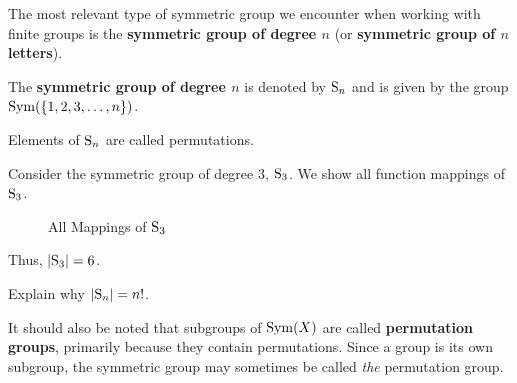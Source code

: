 The most relevant type of symmetric group we encounter when working with finite groups is the \textbf{symmetric group of degree $n$} (or \textbf{symmetric group of $n$ letters}).
\begin{definition}
    The \textbf{symmetric group of degree $n$} is denoted by $\mathrm{S}_{n}$ and is given by the group $\mathrm{Sym}(\{1, 2, 3, \dots, n\})$.
\end{definition}
\begin{remark}
    Elements of $\mathrm{S}_{n}$ are called permutations.
\end{remark}

\begin{example}\label{example-symmetric-group-of-degree-3}
    Consider the symmetric group of degree 3, $\mathrm{S}_{3}$. We show all function mappings of $\mathrm{S}_{3}$.

    \begin{figure}[h]
        \centering
        \caption{All Mappings of $\mathrm{S}_{3}$}
    \end{figure}

    Thus, $|\mathrm{S}_{3}| = 6$.
\end{example}
\begin{exercise}\label{exercise-order-of-Sn}
    Explain why $|\mathrm{S}_{n}| = n!$.
\end{exercise}

It should also be noted that subgroups of $\mathrm{Sym}(X)$ are called \textbf{permutation groups}, primarily because they contain permutations. Since a group is its own subgroup, the symmetric group may sometimes be called \textit{the} permutation group.

